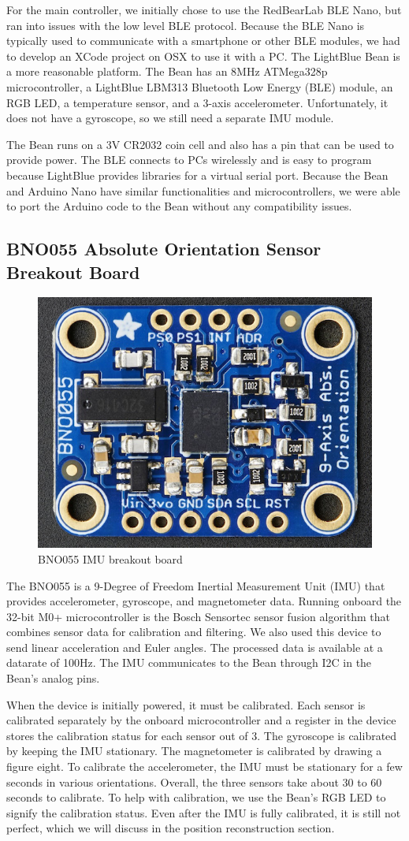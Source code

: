 \documentclass[10pt,journal]{IEEEtran}
\begin{document}
For the main controller, we initially chose to use the RedBearLab BLE Nano, but ran into issues with the low level BLE protocol. Because the BLE Nano is typically used to communicate with a smartphone or other BLE modules, we had to develop an XCode project on OSX to use it with a PC.
The LightBlue Bean is a more reasonable platform. The Bean has an 8MHz ATMega328p microcontroller, a LightBlue LBM313 Bluetooth Low Energy (BLE) module, an RGB LED, a temperature sensor, and a 3-axis accelerometer. Unfortunately, it does not have a gyroscope, so we still need a separate IMU module. 
\par The Bean runs on a 3V CR2032 coin cell and also has a pin that can be used to provide power. The BLE connects to PCs wirelessly and is easy to program because LightBlue provides libraries for a virtual serial port. Because the Bean and Arduino Nano have similar functionalities and microcontrollers, we were able to port the Arduino code to the Bean without any compatibility issues.

\subsection{BNO055 Absolute Orientation Sensor Breakout Board}

\begin{figure}[H]
  \centering
    \includegraphics[width=0.6\linewidth]{figures/imu}
  \caption{BNO055 IMU breakout board}
  \label{fig:imu}
\end{figure}
  The BNO055 is a 9-Degree of Freedom Inertial Measurement Unit (IMU) that provides accelerometer, gyroscope, and magnetometer data. Running onboard the 32-bit M0+ microcontroller is the Bosch Sensortec sensor fusion algorithm that combines sensor data for calibration and filtering. We also used this device to send linear acceleration and Euler angles. The processed data is available at a datarate of 100Hz. The IMU communicates to the Bean through I2C in the Bean's analog pins.
\par When the device is initially powered, it must be calibrated. Each sensor is calibrated separately by the onboard microcontroller and a register in the device stores the calibration status for each sensor out of 3. The gyroscope is calibrated by keeping the IMU stationary. The magnetometer is calibrated by drawing a figure eight. To calibrate the accelerometer, the IMU must be stationary for a few seconds in various orientations. Overall, the three sensors take about 30 to 60 seconds to calibrate. To help with calibration, we use the Bean's RGB LED to signify the calibration status. Even after the IMU is fully calibrated, it is still not perfect, which we will discuss in the position reconstruction section.
\end{document}
